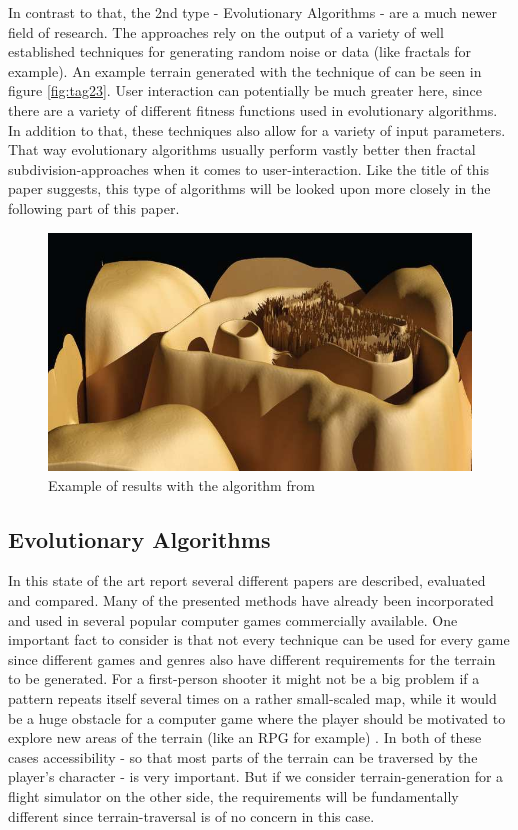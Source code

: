 In contrast to that, the 2nd type - Evolutionary Algorithms - are a much newer field of research. The approaches rely on the output of a variety of well established techniques for generating random noise or data (like fractals for example). An example terrain generated with the technique of \cite{togelius2010towards} can be seen in figure \ref{fig:tag23}. User interaction can potentially be much greater here, since there are a variety of different fitness functions used in evolutionary algorithms. In addition to that, these techniques also allow for a variety of input parameters. That way evolutionary algorithms usually perform vastly better then fractal subdivision-approaches when it comes to user-interaction. Like the title of this paper suggests, this type of algorithms will be looked upon more closely in the following part of this paper.

\begin{figure}[htb]
	\centering
	\includegraphics[width=\linewidth]{RZL12/hfhhf.jpg}
	\caption{Example of results with the algorithm from \cite{frade2009breeding}}
	\label{fig:tag19}
\end{figure}

\subsection{Evolutionary Algorithms}
In this state of the art report several different papers are described, evaluated and compared. Many of the presented methods have already been incorporated and used in several popular computer games commercially available. One important fact to consider is that not every technique can be used for every game since different games and genres also have different requirements for the terrain to be generated. For a first-person shooter it might not be a big problem if a pattern repeats itself several times on a rather small-scaled map, while it would be a huge obstacle for a computer game where the player should be motivated to explore new areas of the terrain (like an RPG for example) \cite{raffe2012survey}. In both of these cases accessibility - so that most parts of the terrain can be traversed by the player's character - is very important. But if we consider terrain-generation for a flight simulator on the other side, the requirements will be fundamentally different since terrain-traversal is of no concern in this case.

